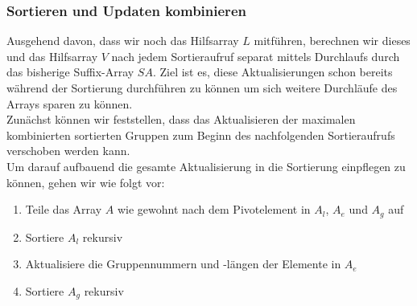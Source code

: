 \subsubsection{Sortieren und Updaten kombinieren}
Ausgehend davon, dass wir noch das Hilfsarray $L$ mitführen, berechnen wir dieses und das Hilfsarray $V$ nach jedem Sortieraufruf separat mittels Durchlaufs durch das bisherige Suffix-Array $SA$. Ziel ist es, diese Aktualisierungen schon bereits während der Sortierung durchführen zu können um sich weitere Durchläufe des Arrays sparen zu können. \\
Zunächst können wir feststellen, dass das Aktualisieren der maximalen kombinierten sortierten Gruppen zum Beginn des nachfolgenden Sortieraufrufs verschoben werden kann.  \\
Um darauf aufbauend die gesamte Aktualisierung in die Sortierung einpflegen zu können, gehen wir wie folgt vor:
\begin{enumerate}
\item Teile das Array $A$ wie gewohnt nach dem Pivotelement in $A_l$, $A_e$ und $A_g$ auf
\item Sortiere $A_l$ rekursiv
\item Aktualisiere die Gruppennummern und -längen der Elemente in $A_e$
\item Sortiere $A_g$ rekursiv
\end{enumerate}

